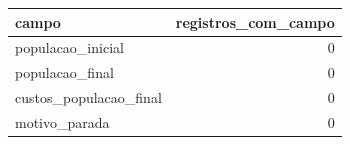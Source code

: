 \begin{tabular}{lr}
\toprule
campo & registros\_com\_campo \\
\midrule
populacao\_inicial & 0 \\
populacao\_final & 0 \\
custos\_populacao\_final & 0 \\
motivo\_parada & 0 \\
\bottomrule
\end{tabular}
